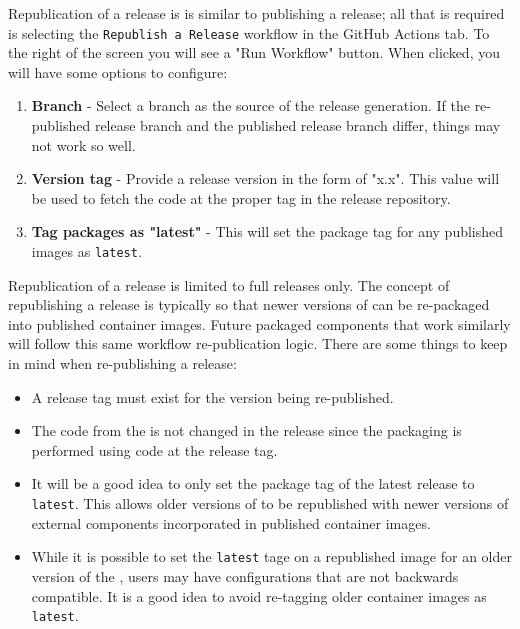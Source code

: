 Republication of a release is is similar to publishing a release;
all that is required is selecting the \texttt{Republish a Release}
workflow in the GitHub Actions tab.  To the right of the screen you will see
a "Run Workflow" button.  When clicked, you will have some options to configure:

\begin{enumerate}
    \item \textbf{Branch} - Select a branch as the source of the release generation.
    If the re-published release branch and the published release branch differ, things
    may not work so well.
    \item \textbf{Version tag} - Provide a release version in the form of "x.x".  
    This value will be used to fetch the code at the proper tag in the release
    repository.
    \item \textbf{Tag packages as "latest"} - This will set the package tag
    for any published images as \texttt{latest}. 
\end{enumerate}

Republication of a release is limited to full releases only.  The concept of
republishing a release is typically so that newer versions of \cxflow can be
re-packaged into \cxflowplusplus published container images.  Future packaged
components that work similarly will follow this same workflow re-publication
logic.  There are  some things to keep in mind when re-publishing a release:

\begin{itemize}
    \item A release tag must exist for the version being re-published.
    \item The code from the \cxtoolkit is not changed in the release since
    the packaging is performed using code at the release tag.
    \item It will be a good idea to only set the package tag of the latest
    release to \texttt{latest}.  This allows older versions of \cxtoolkit
    to be republished with newer versions of external components incorporated
    in published container images.
    \item While it is possible to set the \texttt{latest} tage on a republished
    image for an older version of the \cxtoolkit, users may have configurations
    that are not backwards compatible.  It is a good idea to avoid re-tagging
    older container images as \texttt{latest}.
\end{itemize}

